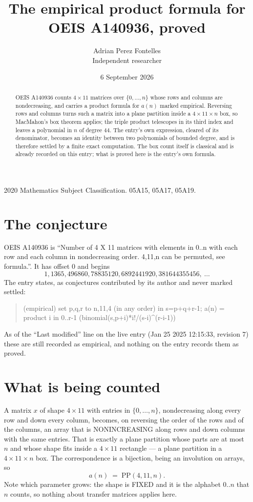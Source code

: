 \documentclass[11pt,a4paper]{article}
\title{The empirical product formula for OEIS A140936, proved}
\author{Adrian Perez Fontelles\\ \small Independent researcher}
\date{6 September 2026}
\theoremstyle{plain}
\theoremstyle{definition}
\begin{document}
\maketitle

\begin{abstract}
OEIS A140936 counts $4\times11$ matrices over $\{0,\dots,n\}$ whose rows and columns are
nondecreasing, and carries a product formula for $a(n)$ marked empirical. Reversing rows and
columns turns such a matrix into a plane partition inside a $4\times11\times n$ box, so
MacMahon's box theorem applies; the triple product telescopes in its third index and leaves a
polynomial in $n$ of degree $44$. The entry's own expression, cleared of its denominator,
becomes an identity between two polynomials of bounded degree, and is therefore settled by a
finite exact computation. The box count itself is classical and is already recorded on this
entry; what is proved here is the entry's own formula.
\end{abstract}

\noindent\small 2020 Mathematics Subject Classification. 05A15, 05A17, 05A19.\normalsize

\section{The conjecture}

OEIS A140936 is ``Number of 4 X 11 matrices with elements in 0..n with each row and each column in nondecreasing order. 4,11,n can be permuted, see formula.''. It has offset $0$ and begins
\[
1, 1365, 496860, 78835120, 6892441920, 381644355456,\ \dots
\]
The entry states, as conjectures contributed by its author and never marked settled:
\begin{quote}
(empirical) set p,q,r to n,11,4 (in any order) in s=p+q+r-1; a(n) = product {i in 0..r-1} (binomial(s,p+i)*i!/(s-i)\^{}(r-i-1))

\end{quote}
As of the ``Last modified'' line on the live entry (Jan 25 2025 12:15:33, revision 7) these are still
recorded as empirical, and nothing on the entry records them as proved.

\section{What is being counted}

A matrix $x$ of shape $4\times11$ with entries in $\{0,\dots,n\}$, nondecreasing along
every row and down every column, becomes, on reversing the order of the rows and of the
columns, an array that is NONINCREASING along rows and down columns with the same entries. That
is exactly a plane partition whose parts are at most $n$ and whose shape fits inside a
$4\times11$ rectangle --- a plane partition in a $4\times11\times n$ box. The
correspondence is a bijection, being an involution on arrays, so
\[
a(n)\;=\;\mathrm{PP}(4,11,n).
\]
Note which parameter grows: the shape is FIXED and it is the alphabet $0..n$ that $n$ counts,
so nothing about transfer matrices applies here.
\end{document}
